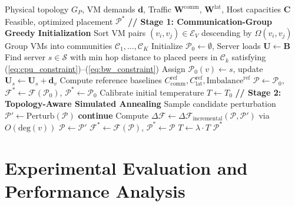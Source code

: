 \documentclass[conference]{IEEEtran}
\begin{document}
\begin{algorithm}[t]
\caption{Hybrid VM Placement Optimization}
\label{alg:hybrid}
\begin{algorithmic}[1]
\REQUIRE Physical topology $G_P$, VM demands $\mathbf{d}$, Traffic $\mathbf{W}^{\mathrm{comm}}$, $\mathbf{W}^{\mathrm{lat}}$, Host capacities $\mathbf{C}$
\ENSURE Feasible, optimized placement $\mathcal{P}^*$
\STATE \textbf{// Stage 1: Communication-Group Greedy Initialization}
\STATE Sort VM pairs $(v_i, v_j) \in \mathcal{E}_V$ descending by $\Omega(v_i, v_j)$
\STATE Group VMs into communities $\mathcal{C}_1, \dots, \mathcal{C}_K$
\STATE Initialize $\mathcal{P}_0 \gets \emptyset$, Server loads $\mathbf{U} \gets \mathbf{B}$
        \STATE Find server $s \in \mathcal{S}$ with min hop distance to placed peers in $\mathcal{C}_k$ satisfying (\ref{eq:cpu_constraint})--(\ref{eq:bw_constraint})
        \STATE Assign $\mathcal{P}_0(v) \gets s$, update $\mathbf{U}_s \gets \mathbf{U}_s + \mathbf{d}_v$
    \ENDFOR
\ENDFOR
\STATE Compute reference baselines $C_{\mathrm{comm}}^{\mathrm{ref}}, C_{\mathrm{lat}}^{\mathrm{ref}}, \mathrm{Imbalance}^{\mathrm{ref}}$
\STATE $\mathcal{P} \gets \mathcal{P}_0$, $\mathcal{F}^* \gets \mathcal{F}(\mathcal{P}_0)$, $\mathcal{P}^* \gets \mathcal{P}_0$
\STATE Calibrate initial temperature $T \gets T_0$
\STATE \textbf{// Stage 2: Topology-Aware Simulated Annealing}
        \STATE Sample candidate perturbation $\mathcal{P}' \gets \mathrm{Perturb}(\mathcal{P})$
            \STATE \textbf{continue}
        \ENDIF
        \STATE Compute $\Delta \mathcal{F} \gets \Delta \mathcal{F}_{\mathrm{incremental}}(\mathcal{P}, \mathcal{P}')$ via $O(\mathrm{deg}(v))$
            \STATE $\mathcal{P} \gets \mathcal{P}'$
                \STATE $\mathcal{F}^* \gets \mathcal{F}(\mathcal{P})$, $\mathcal{P}^* \gets \mathcal{P}$
            \ENDIF
        \ENDIF
    \ENDFOR
    \STATE $T \gets \lambda \cdot T$
\ENDWHILE
\RETURN $\mathcal{P}^*$
\end{algorithmic}
\end{algorithm}

\section{Experimental Evaluation and Performance Analysis}
\label{sec:experiments}
\end{document}
